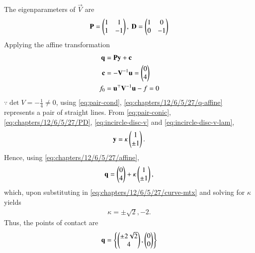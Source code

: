 The eigenparameters of $\vec{V}$ are
    \begin{align}
        \label{eq:chapters/12/6/5/27/PD}
        \mathbf{P} = \begin{pmatrix}1&1\\1&-1\end{pmatrix},\ \mathbf{D} = \begin{pmatrix}1&0\\0&-1\end{pmatrix}
    \end{align}
    Applying the affine transformation
    \begin{align}
        \label{eq:chapters/12/6/5/27/affine}
        \mathbf{q} &= \mathbf{Py} + \mathbf{c} \\
        \mathbf{c} &= -\mathbf{V}^{-1}\mathbf{u} 
 =\begin{pmatrix}0\\4\end{pmatrix} \\
        f_0 &= \mathbf{u}^\top\mathbf{V}^{-1}\mathbf{u} - f 
            =  0
    \end{align}
$\because \det{V} = -\frac{1}{4} \neq 0$, 
	  using \eqref{eq:pair-cond},
        \eqref{eq:chapters/12/6/5/27/q-affine}
 represents a pair of straight lines.
      From \eqref{eq:pair-conic},
        \eqref{eq:chapters/12/6/5/27/PD},
	\eqref{eq:incircle-disc-v}
	and 
	\eqref{eq:incircle-disc-v-lam},
    \begin{align}
\mathbf{y} = \kappa\begin{pmatrix}1\\\pm 1\end{pmatrix}.
        \label{eq:chapters/12/6/5/27/y-sol}
    \end{align}
    Hence, using 
        \eqref{eq:chapters/12/6/5/27/affine},
    \begin{align}
        \mathbf{q} 
                = \begin{pmatrix}0\\4\end{pmatrix}+\kappa\begin{pmatrix}1\\\pm 1\end{pmatrix},
        \label{eq:chapters/12/6/5/27/x-case}
    \end{align}
which, upon substituting in 
        \eqref{eq:chapters/12/6/5/27/curve-mtx}
	and solving for $\kappa$ yields
\begin{align}
	\kappa = \pm \sqrt{2}, -2.
\end{align}
 Thus, the points of contact are
    \begin{align}
        \mathbf{q}  = \left\{\begin{pmatrix}\pm 2\sqrt{2}\\4\end{pmatrix},\begin{pmatrix}0\\0\end{pmatrix}\right\}
        \label{eq:chapters/12/6/5/27/poc-ans}
    \end{align}
